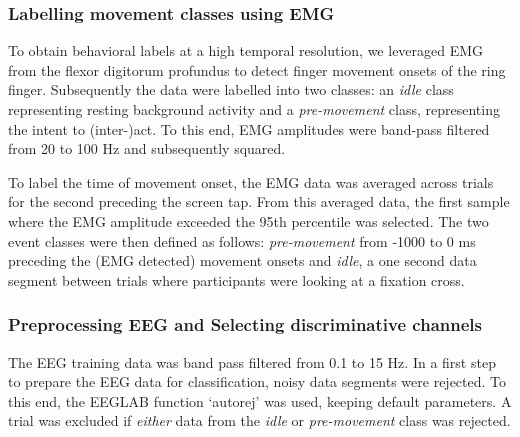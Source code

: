 \subsubsection{Labelling movement classes using EMG}
To obtain behavioral labels at a high temporal resolution, we leveraged EMG from the flexor digitorum profundus to detect finger movement onsets of the ring finger. Subsequently the data were labelled into two classes: an \textit{idle} class representing resting background activity and a \textit{pre-movement} class, representing the intent to (inter-)act. To this end, EMG amplitudes were band-pass filtered from 20 to 100 Hz and subsequently squared. 


To label the time of movement onset, the EMG data was averaged across trials for the second preceding the screen tap. From this averaged data, the first sample where the EMG amplitude exceeded the 95th percentile was selected. The two event classes were then defined as follows: \textit{pre-movement} from -1000 to 0 ms preceding the (EMG detected) movement onsets and \textit{idle}, a one second data segment between trials where participants were looking at a fixation cross.


\subsubsection{Preprocessing EEG and Selecting discriminative channels}
The EEG training data was band pass filtered from 0.1 to 15 Hz. In a first step to prepare the EEG data for classification, noisy data segments were rejected. To this end, the EEGLAB function `autorej' was used, keeping default parameters. A trial was excluded if \textit{either} data from the \textit{idle} or \textit{pre-movement} class was rejected.

